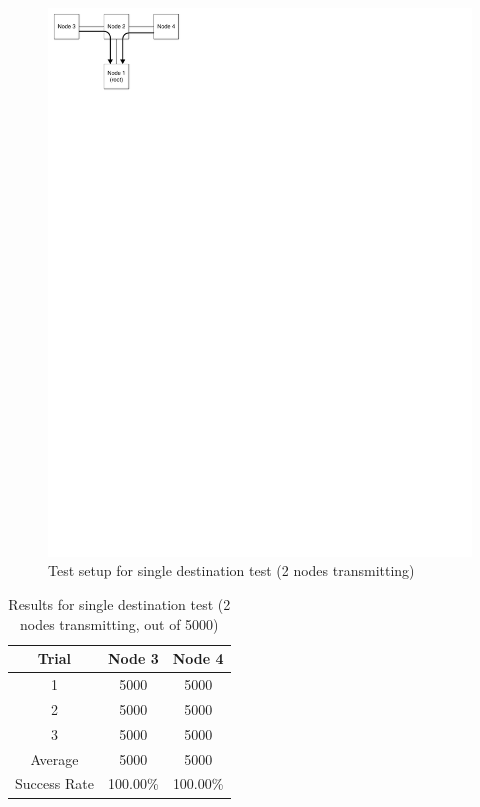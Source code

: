\begin{figure}[ptb]
	\begin{centering}
		\includegraphics{Protocol/Figures/protocol-2_t_flood_test.pdf}
		\caption{Test setup for single destination test (2 nodes transmitting)}
		\label{fig:protocol:2_t_flood_test}
	\end{centering}
\end{figure}

\begin{table}
	\begin{center}
		\setlength{\extrarowheight}{1.5pt}
		\caption{Results for single destination test (2 nodes transmitting, out of 5000)}
		\vspace{0.1cm}
		\begin{tabular} {|c|c|c|}
			\hline
			\textbf{Trial} & \textbf{Node} 3 & \textbf{Node 4} \\
			\hline
			\hline
			1 & 5000 & 5000 \\
			\hline
			2 & 5000 & 5000 \\
			\hline
			3 & 5000 & 5000 \\
			\hline
			\hline
			Average & 5000 & 5000 \\
			\hline
			Success Rate & 100.00\% & 100.00\% \\
			\hline
		\end{tabular}
		\label{tab:protocol:2_t_flood_test}
	\end{center}
\end{table}

